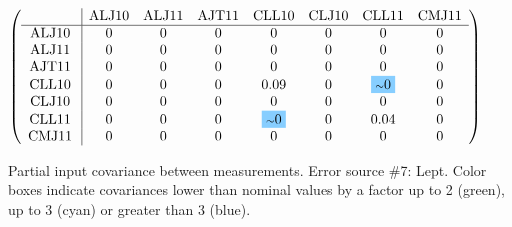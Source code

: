 \begin{table}[H]
\scriptsize
\begin{center}
\renewcommand{\arraystretch}{1.1}
\begin{math}\left(\begin{array}{c|ccccccc}
 & \mathrm{ALJ10} & 
\mathrm{ALJ11} & 
\mathrm{AJT11} & 
\mathrm{CLL10} & 
\mathrm{CLJ10} & 
\mathrm{CLL11} & 
\mathrm{CMJ11} \\
\hline
\mathrm{ALJ10} \hspace*{2pt} &  0 &  0 &  0 &  0 &  0 &  0 &  0 \\
\mathrm{ALJ11} \hspace*{2pt} &  0 &  0 &  0 &  0 &  0 &  0 &  0 \\
\mathrm{AJT11} \hspace*{2pt} &  0 &  0 &  0 &  0 &  0 &  0 &  0 \\
\mathrm{CLL10} \hspace*{2pt} &  0 &  0 &  0 &       0.09 &  0 &  \colorbox{SkyBlue1}{$ {\scriptstyle \sim }0$} &  0 \\
\mathrm{CLJ10} \hspace*{2pt} &  0 &  0 &  0 &  0 &  0 &  0 &  0 \\
\mathrm{CLL11} \hspace*{2pt} &  0 &  0 &  0 &  \colorbox{SkyBlue1}{$ {\scriptstyle \sim }0$} &  0 &       0.04 &  0 \\
\mathrm{CMJ11} \hspace*{2pt} &  0 &  0 &  0 &  0 &  0 &  0 &  0 \\
\end{array}\right)\end{math}
\caption{Partial input covariance between measurements. Error source \#7: Lept. Color boxes indicate covariances lower than nominal values by a factor up to 2 (green), up to 3 (cyan) or greater than 3 (blue).}
\renewcommand{\arraystretch}{1}
\end{center}
\end{table}
